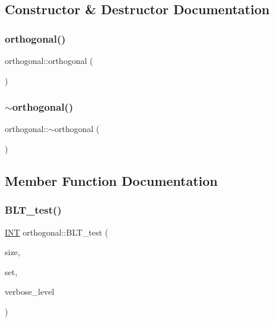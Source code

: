 \subsection{Constructor \& Destructor Documentation}
\mbox{\label{classorthogonal_aec89749e7c5880e95b04426ff4b2b066}} 
\subsubsection{\texorpdfstring{orthogonal()}{orthogonal()}}
{\footnotesize\ttfamily orthogonal\+::orthogonal (\begin{DoxyParamCaption}{ }\end{DoxyParamCaption})}

\mbox{\label{classorthogonal_a84fcdf0c9d523a3a7345429a501ddec0}} 
\subsubsection{\texorpdfstring{$\sim$orthogonal()}{~orthogonal()}}
{\footnotesize\ttfamily orthogonal\+::$\sim$orthogonal (\begin{DoxyParamCaption}{ }\end{DoxyParamCaption})}



\subsection{Member Function Documentation}
\mbox{\label{classorthogonal_a019329f3f04ea9accbca7f7816183f6a}} 
\subsubsection{\texorpdfstring{B\+L\+T\+\_\+test()}{BLT\_test()}}
{\footnotesize\ttfamily \mbox{\hyperlink{galois_8h_a09fddde158a3a20bd2dcadb609de11dc}{I\+NT}} orthogonal\+::\+B\+L\+T\+\_\+test (\begin{DoxyParamCaption}\item[{\mbox{\hyperlink{galois_8h_a09fddde158a3a20bd2dcadb609de11dc}{I\+NT}}}]{size,  }\item[{\mbox{\hyperlink{galois_8h_a09fddde158a3a20bd2dcadb609de11dc}{I\+NT}} $\ast$}]{set,  }\item[{\mbox{\hyperlink{galois_8h_a09fddde158a3a20bd2dcadb609de11dc}{I\+NT}}}]{verbose\+\_\+level }\end{DoxyParamCaption})}

